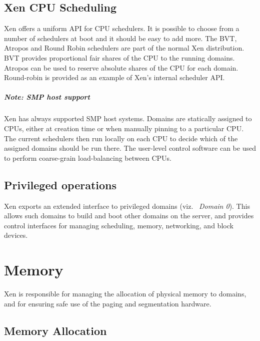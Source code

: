 \documentclass[11pt,twoside,final,openright]{report}
\begin{document}

\section{Xen CPU Scheduling}

Xen offers a uniform API for CPU schedulers.  It is possible to choose
from a number of schedulers at boot and it should be easy to add more.
The BVT, Atropos and Round Robin schedulers are part of the normal
Xen distribution.  BVT provides proportional fair shares of the CPU to
the running domains.  Atropos can be used to reserve absolute shares
of the CPU for each domain.  Round-robin is provided as an example of
Xen's internal scheduler API.

\paragraph*{Note: SMP host support}
Xen has always supported SMP host systems.  Domains are statically assigned to
CPUs, either at creation time or when manually pinning to a particular CPU.
The current schedulers then run locally on each CPU to decide which of the
assigned domains should be run there. The user-level control software 
can be used to perform coarse-grain load-balancing between CPUs. 




\section{Privileged operations}

Xen exports an extended interface to privileged domains (viz.\ {\it
  Domain 0}). This allows such domains to build and boot other domains 
on the server, and provides control interfaces for managing 
scheduling, memory, networking, and block devices. 


\chapter{Memory}
\label{c:memory} 

Xen is responsible for managing the allocation of physical memory to
domains, and for ensuring safe use of the paging and segmentation
hardware.


\section{Memory Allocation}
\end{document}
